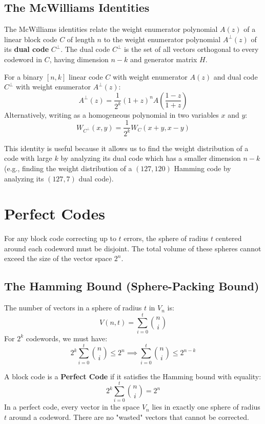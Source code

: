\documentclass[12pt,a4paper]{article}
\begin{document}
\subsection{The McWilliams Identities}
The McWilliams identities relate the weight enumerator polynomial $A(z)$ of a linear block code $C$ of length $n$ to the weight enumerator polynomial $A^\perp(z)$ of its \textbf{dual code} $C^\perp$. The dual code $C^\perp$ is the set of all vectors orthogonal to every codeword in $C$, having dimension $n-k$ and generator matrix $H$.

\begin{tcolorbox}[formulabox, title={\textbf{McWilliams Identity Theorem}}]
For a binary $[n, k]$ linear code $C$ with weight enumerator $A(z)$ and dual code $C^\perp$ with weight enumerator $A^\perp(z)$:
\[ A^\perp(z) = \frac{1}{2^k} (1+z)^n A\left( \frac{1-z}{1+z} \right) \]
Alternatively, writing as a homogeneous polynomial in two variables $x$ and $y$:
\[ W_{C^\perp}(x, y) = \frac{1}{2^k} W_C(x+y, x-y) \]
\end{tcolorbox}
This identity is useful because it allows us to find the weight distribution of a code with large $k$ by analyzing its dual code which has a smaller dimension $n-k$ (e.g., finding the weight distribution of a $(127, 120)$ Hamming code by analyzing its $(127, 7)$ dual code).

\section{Perfect Codes}

For any block code correcting up to $t$ errors, the sphere of radius $t$ centered around each codeword must be disjoint. The total volume of these spheres cannot exceed the size of the vector space $2^n$.

\subsection{The Hamming Bound (Sphere-Packing Bound)}
The number of vectors in a sphere of radius $t$ in $V_n$ is:
\[ V(n, t) = \sum_{i=0}^t \binom{n}{i} \]
For $2^k$ codewords, we must have:
\[ 2^k \sum_{i=0}^t \binom{n}{i} \le 2^n \implies \sum_{i=0}^t \binom{n}{i} \le 2^{n-k} \]

\begin{tcolorbox}[defbox, title={\textbf{Perfect Code Definition}}]
A block code is a \textbf{Perfect Code} if it satisfies the Hamming bound with equality:
\[ 2^k \sum_{i=0}^t \binom{n}{i} = 2^n \]
In a perfect code, every vector in the space $V_n$ lies in exactly one sphere of radius $t$ around a codeword. There are no "wasted" vectors that cannot be corrected.
\end{tcolorbox}
\end{document}
